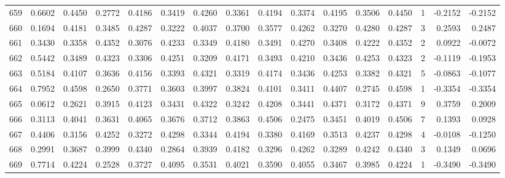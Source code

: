\begin{tabular}{lrrrrrrrrrrrrrrr}
659 &      0.6602 &  0.4450 &  0.2772 &  0.4186 &  0.3419 &  0.4260 &  0.3361 &  0.4194 &  0.3374 &  0.4195 &   0.3506 &     0.4450 &      1 &                   -0.2152 &                    -0.2152 \\
660 &      0.1694 &  0.4181 &  0.3485 &  0.4287 &  0.3222 &  0.4037 &  0.3700 &  0.3577 &  0.4262 &  0.3270 &   0.4280 &     0.4287 &      3 &                    0.2593 &                     0.2487 \\
661 &      0.3430 &  0.3358 &  0.4352 &  0.3076 &  0.4233 &  0.3349 &  0.4180 &  0.3491 &  0.4270 &  0.3408 &   0.4222 &     0.4352 &      2 &                    0.0922 &                    -0.0072 \\
662 &      0.5442 &  0.3489 &  0.4323 &  0.3306 &  0.4251 &  0.3209 &  0.4171 &  0.3493 &  0.4210 &  0.3436 &   0.4253 &     0.4323 &      2 &                   -0.1119 &                    -0.1953 \\
663 &      0.5184 &  0.4107 &  0.3636 &  0.4156 &  0.3393 &  0.4321 &  0.3319 &  0.4174 &  0.3436 &  0.4253 &   0.3382 &     0.4321 &      5 &                   -0.0863 &                    -0.1077 \\
664 &      0.7952 &  0.4598 &  0.2650 &  0.3771 &  0.3603 &  0.3997 &  0.3824 &  0.4101 &  0.3411 &  0.4407 &   0.2745 &     0.4598 &      1 &                   -0.3354 &                    -0.3354 \\
665 &      0.0612 &  0.2621 &  0.3915 &  0.4123 &  0.3431 &  0.4322 &  0.3242 &  0.4208 &  0.3441 &  0.4371 &   0.3172 &     0.4371 &      9 &                    0.3759 &                     0.2009 \\
666 &      0.3113 &  0.4041 &  0.3631 &  0.4065 &  0.3676 &  0.3712 &  0.3863 &  0.4506 &  0.2475 &  0.3451 &   0.4019 &     0.4506 &      7 &                    0.1393 &                     0.0928 \\
667 &      0.4406 &  0.3156 &  0.4252 &  0.3272 &  0.4298 &  0.3344 &  0.4194 &  0.3380 &  0.4169 &  0.3513 &   0.4237 &     0.4298 &      4 &                   -0.0108 &                    -0.1250 \\
668 &      0.2991 &  0.3687 &  0.3999 &  0.4340 &  0.2864 &  0.3939 &  0.4182 &  0.3296 &  0.4262 &  0.3289 &   0.4242 &     0.4340 &      3 &                    0.1349 &                     0.0696 \\
669 &      0.7714 &  0.4224 &  0.2528 &  0.3727 &  0.4095 &  0.3531 &  0.4021 &  0.3590 &  0.4055 &  0.3467 &   0.3985 &     0.4224 &      1 &                   -0.3490 &                    -0.3490 \\

\end{tabular}
